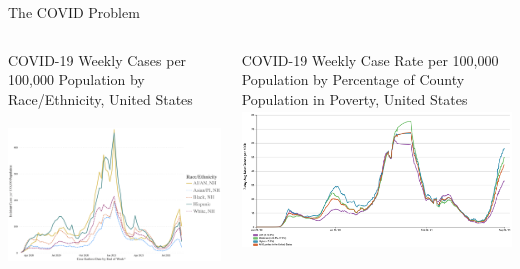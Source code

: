 \begin{slide}{The COVID Problem}
	\centering
	\begin{columns}[T]
		\begin{column}{.5\textwidth}
			\centering
			COVID-19 Weekly Cases per 100,000 Population by Race/Ethnicity, United States
			\includegraphics[height=4.5cm]{images/ethnicity-trends}
		\end{column}
		\begin{column}{.5\textwidth}
			\centering
			COVID-19 Weekly Case Rate per 100,000 Population by Percentage of County Population in Poverty, United States
			\includegraphics[height=3.7cm]{images/poverty-trends}
		\end{column}
	\end{columns}
\end{slide}
